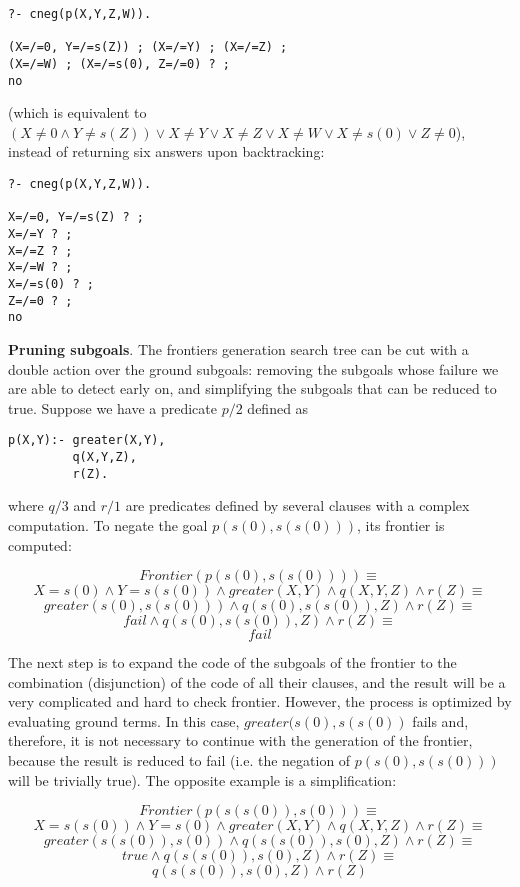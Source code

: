 \documentclass{llncs}
\begin{document}
\begin{verbatim}
?- cneg(p(X,Y,Z,W)).

(X=/=0, Y=/=s(Z)) ; (X=/=Y) ; (X=/=Z) ; 
(X=/=W) ; (X=/=s(0), Z=/=0) ? ;
no
\end{verbatim}

\noindent
(which is equivalent to $ (X \neq 0 \wedge Y\neq s(Z)) \vee X \neq Y
\vee X \neq Z \vee X \neq W \vee X \neq s(0) \vee Z \neq 0$),
instead of returning six answers upon backtracking:
\begin{verbatim}
?- cneg(p(X,Y,Z,W)).

X=/=0, Y=/=s(Z) ? ;
X=/=Y ? ;
X=/=Z ? ;
X=/=W ? ;
X=/=s(0) ? ;
Z=/=0 ? ;
no
\end{verbatim}


\noindent
{\bf Pruning subgoals}. The frontiers generation search tree can be
cut with a double action over the ground subgoals: removing the
subgoals whose failure we are able to detect early on, and simplifying the
subgoals that can be reduced to true. Suppose  we have a predicate $p/2$
defined as
\begin{verbatim}
p(X,Y):- greater(X,Y),
         q(X,Y,Z),
         r(Z).
\end{verbatim}
\noindent
where $q/3$ and $r/1$ are predicates defined by several
clauses with a complex computation. To negate
the goal $p(s(0),s(s(0)))$, its frontier is computed:

$$Frontier(p(s(0),s(s(0)))) \equiv $$
$${ X=s(0) \wedge Y=s(s(0)) \wedge
  greater(X,Y) \wedge q(X,Y,Z) \wedge r(Z) } \equiv $$
$${ greater(s(0),s(s(0))) \wedge q(s(0),s(s(0)),Z) \wedge r(Z) } \equiv $$
$${ fail  \wedge q(s(0),s(s(0)),Z) \wedge r(Z) } \equiv $$
$$fail $$

The next step is to expand the code of the subgoals of the frontier to
the combination (disjunction) of the code of all their clauses, and the
result will be a very complicated and hard to check frontier.
However, the process is optimized by evaluating ground terms. In this
case, $greater(s(0),s(s(0))$ fails and, therefore, it is not necessary to
continue with the generation of the frontier, because the result is
reduced to fail (i.e. the negation of $p (s(0), s(s(0)))$ will be
trivially true). The opposite example is a simplification:

$$Frontier(p(s(s(0)),s(0))) \equiv $$
$${ X=s(s(0)) \wedge Y=s(0) \wedge greater(X,Y) \wedge q(X,Y,Z) \wedge
  r(Z) } \equiv $$
$${ greater(s(s(0)),s(0)) \wedge q(s(s(0)),s(0),Z) \wedge r(Z) } \equiv
$$
$${ true \wedge q(s(s(0)),s(0),Z) \wedge r(Z) } \equiv $$
$${ q(s(s(0)),s(0),Z) \wedge r(Z) } $$
\end{document}
